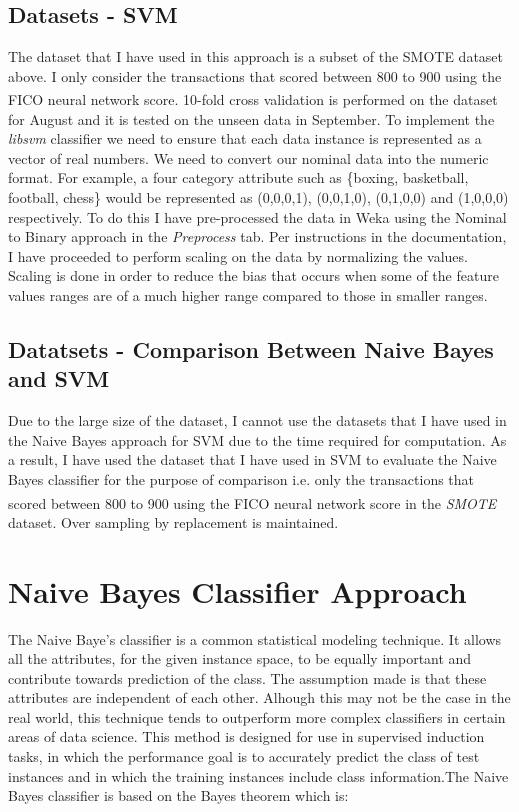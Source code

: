\documentclass[conference]{IEEEtran}
\begin{document}
\subsection{Datasets - SVM}

The dataset that I have used in this approach is a subset of the SMOTE dataset above. I only consider the transactions that scored between 800 to 900 using the FICO\textsuperscript{\textregistered} neural network score. 10-fold cross validation is performed on the dataset for August and it is tested on the unseen data in September. To implement the \textit{libsvm} classifier we need to ensure that each data instance is represented as a vector of real numbers. We need to convert our nominal data into the numeric format. For example, a four category attribute such as \{boxing, basketball, football, chess\} would be represented as (0,0,0,1), (0,0,1,0), (0,1,0,0) and (1,0,0,0) respectively. To do this I have pre-processed the data in Weka using the Nominal to Binary approach in the \textit{Preprocess} tab. Per instructions in the documentation, I have proceeded to perform scaling on the data by normalizing the values. Scaling is done in order to reduce the bias that occurs when some of the feature values ranges are of a much higher range compared to those in smaller ranges.

\subsection{Datatsets - Comparison Between Naive Bayes and SVM}

Due to the large size of the dataset, I cannot use the datasets that I have used in the Naive Bayes approach for SVM due to the time required for computation. As a result, I have used the dataset that I have used in SVM to evaluate the Naive Bayes classifier for the purpose of comparison i.e. only the transactions that scored between 800 to 900 using the FICO\textsuperscript{\textregistered} neural network score in the \textit{SMOTE} dataset. Over sampling by replacement is maintained.


\section{Naive Bayes Classifier Approach}

The Naive Baye’s classifier is a common statistical modeling technique. It allows all the attributes, for the given instance space, to be equally important and contribute towards prediction of the class. The assumption made is that these attributes are independent of each other. Alhough this may not be the case in the real world, this technique tends to outperform more complex classifiers in certain areas of data science. This method is designed for use in supervised induction tasks, in which the performance goal is to accurately predict the class of test instances and in which the training instances include class information\cite{john1995}.The Naive Bayes classifier is based on the Bayes theorem which is:
\end{document}
